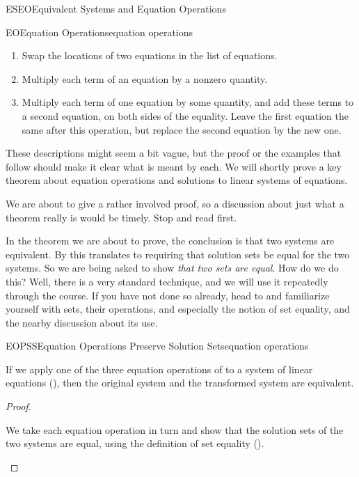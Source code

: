 \begin{subsect}{ESEO}{Equivalent Systems and Equation Operations}
\begin{definition}{EO}{Equation Operations}{equation operations}
\begin{para}
%
\begin{enumerate}
\item Swap the locations of two equations in the list of equations.
\item Multiply each term of an equation by a nonzero quantity.
\item Multiply each term of one equation by some quantity, and add these terms to a second equation, on both sides of the equality.  Leave the first equation the same after this operation, but replace the second equation by the new one.
\end{enumerate}
\end{para}
%
\end{definition}
%
\begin{para}These descriptions might seem a bit vague, but the proof or the examples that follow should make it clear what is meant by each.  We will shortly prove a key theorem about equation operations and solutions to linear systems of equations.\end{para}
%
\begin{para}We are about to give a rather involved proof, so a discussion about just what a theorem really is would be timely.  Stop and read  first.\end{para}
%
\begin{para}In the theorem we are about to prove, the conclusion is that two systems are equivalent.  By  this translates to requiring that solution sets be equal for the two systems.  So we are being asked to show {\em that two sets are equal}.  How do we do this?  Well, there is a very standard technique, and we will use it repeatedly through the course.  If you have not done so already, head to  and familiarize yourself with sets, their operations, and especially the notion of set equality,  and the nearby discussion about its use.\end{para}
%
%
\begin{theorem}{EOPSS}{Equation Operations Preserve Solution Sets}{equation operations}
\begin{para}If we apply one of the three equation operations of  to a system of linear equations  (), then the original system and the transformed system are equivalent.
\end{para}\end{theorem}
%
\begin{proof}
%
\begin{para}We take each equation operation in turn and show that the solution sets of the two systems are equal, using the definition of set equality ().

\end{para}
\end{proof}
\end{subsect}
